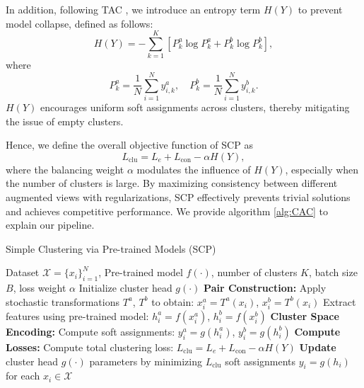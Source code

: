 In addition, following TAC \cite{li2023image}, we introduce an entropy term \( H(Y) \) to prevent model collapse, defined as follows:
\begin{equation}
H(Y) = - \sum_{k=1}^{K} \left[ P^{a}_k \log P^{a}_k + P^{b}_k \log P^{b}_k \right],
\end{equation}
where
\[
P^{a}_k = \frac{1}{N} \sum_{i=1}^{N} y^{a}_{i,k}, \quad P^{b}_k = \frac{1}{N} \sum_{i=1}^{N} y^{b}_{i,k}.
\]
$H(Y)$ encourages uniform soft assignments across clusters, thereby mitigating the issue of empty clusters. 

Hence, we define the overall objective function of SCP as
\begin{equation}
L_{\text{clu}} = L_e + L_{\text{con}} - \alpha H(Y),
\end{equation}
where the balancing weight $\alpha$ modulates the influence of $H(Y)$, especially when the number of clusters is large. By maximizing consistency between different augmented views with regularizations, SCP effectively prevents trivial solutions and achieves competitive performance. We provide algorithm \ref{alg:CAC} to explain our pipeline.

\begin{algorithm}[H]
\caption{Simple Clustering via Pre-trained Models (SCP)}
\label{alg:CAC}
\begin{algorithmic}[1]
    \Require Dataset $\mathcal{X} = \{ x_i \}_{i=1}^{N}$, Pre-trained model $f(\cdot)$, number of clusters $K$, batch size $B$, loss weight $\alpha$
    \State Initialize cluster head $g(\cdot)$
            \State \textbf{Pair Construction:}
                \State Apply stochastic transformations $T^a$, $T^b$ to obtain:
                \State \quad $x_i^a = T^a(x_i)$, \quad $x_i^b = T^b(x_i)$
                \State Extract features using pre-trained model:
                \State \quad $h_i^a = f(x_i^a)$, \quad $h_i^b = f(x_i^b)$
            \EndFor
            \State \textbf{Cluster Space Encoding:}
                \State Compute soft assignments: \quad $y_i^a = g(h_i^a)$, \quad $y_i^b = g(h_i^b)$
            \EndFor
            \State \textbf{Compute Losses:}
            \State Compute total clustering loss:
            \State \quad $L_{\text{clu}} = L_e + L_{\text{con}} - \alpha H(Y)$
            \State \textbf{Update} cluster head $g(\cdot)$ parameters by minimizing $L_{\text{clu}}$
        \EndFor
    \EndFor
    \State \Return soft assignments $y_i = g(h_i)$ for each $x_i \in \mathcal{X}$
\end{algorithmic}
\end{algorithm}


